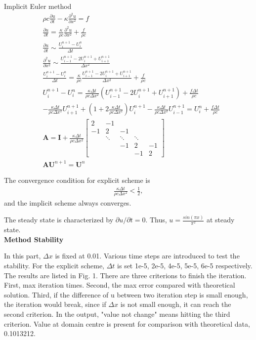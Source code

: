 \documentclass[a4paper,10pt]{article}
\begin{document}
Implicit Euler method
\begin{align*}
& \rho c \frac{\partial u}{\partial t} - \kappa \frac{\partial ^2 u}{\partial x^2} = f \\
& \frac{\partial u}{\partial t} = \frac{\kappa}{\rho c} \frac{\partial ^2 u}{\partial x^2} + \frac{f}{\rho c} \\
& \frac{\partial u}{\partial t} \sim \frac{U_i^{n+1} - U_i^n}{\Delta t} \\
& \frac{\partial ^2 u}{\partial x^2} \sim \frac{U_{i-1}^{n+1} - 2 U_i^{n+1} + U_{i+1}^{n+1}}{\Delta x^2} \\
& \frac{U_i^{n+1} - U_i^n}{\Delta t} = \frac{\kappa}{\rho c} \frac{U_{i-1}^{n+1} - 2 U_i^{n+1} + U_{i+1}^{n+1}}{\Delta x^2} + \frac{f}{\rho c} \\
& U_i^{n+1} - U_i^n = \frac{\kappa \Delta t}{\rho c \Delta x^2} \left( U_{i-1}^{n+1} - 2 U_i^{n+1} + U_{i+1}^{n+1} \right) + \frac{f \Delta t}{\rho c} \\
& - \frac{\kappa \Delta t}{\rho c \Delta x^2} U_{i+1}^{n+1} + \left( 1 + 2 \frac{\kappa \Delta t}{\rho c \Delta x^2} \right) U_i^{n+1} - \frac{\kappa \Delta t}{\rho c \Delta x^2} U_{i-1}^{n+1} = U_i^n + \frac{f \Delta t}{\rho c} \\
& \bm A = \bm I + \frac{\kappa \Delta t}{\rho c \Delta x^2}
\begin{bmatrix}
2  & -1 & \  & \  & \  \\
-1 & 2  & -1 & \  & \  \\
\  & \ddots & \ddots & \ddots & \ \\
\  & \  & -1 & 2  & -1 \\
\  & \  & \  & -1 & 2 
\end{bmatrix} \\
& \bm A \bm U^{n+1} = \bm U^n
\end{align*}

The convergence condition for explicit scheme is 
\begin{align*}
\frac{\kappa \Delta t}{\rho c \Delta x^2} < \frac{1}{2},
\end{align*}
and the implicit scheme always converges.

The steady state is characterized by $\partial u/ \partial t=0$. Thus, $u=\frac{sin(\pi x)}{\pi ^2}$ at steady state.\\

\large \textbf {Method Stability}

In this part, $\Delta x$ is fixed at 0.01. Various time steps are introduced to test the stability. For the explicit scheme,  $\Delta t$ is set 1e-5, 2e-5, 4e-5, 5e-5, 6e-5 respectively. The results are listed in Fig. 1. There are three criterions to finish the iteration. First, max iteration times. Second, the max error compared with theoretical solution. Third, if the difference of u between two iteration step is small enough, the iteration would break, since if $\Delta x$ is not small enough, it can reach the second criterion. In the output, "value not change" means hitting the third criterion. Value at domain centre is present for comparison with theoretical data, 0.1013212.
\end{document}
